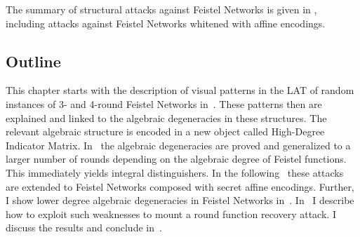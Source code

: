 The summary of structural attacks against Feistel Networks is given in , including attacks against Feistel Networks whitened with affine encodings.


\subsection{Outline}
This chapter starts with the description of visual patterns in the LAT of random instances of 3- and 4-round Feistel Networks in~. These patterns then are explained and linked to the algebraic degeneracies in these structures. The relevant algebraic structure is encoded in a new object called High-Degree Indicator Matrix. In~ the algebraic degeneracies are proved and generalized to a larger number of rounds depending on the algebraic degree of Feistel functions. This immediately yields integral distinguishers. In the following~ these attacks are extended to Feistel Networks composed with secret affine encodings.
Further, I show lower degree algebraic degeneracies in Feistel Networks in~. In~ I describe how to exploit such weaknesses to mount a round function recovery attack. I discuss the results and conclude in~.


